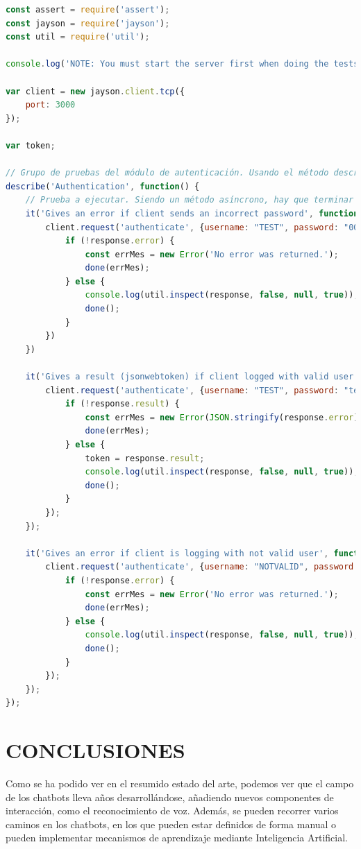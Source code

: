\documentclass[spanish,12pt, a4paper, twoside]{paper}
\let\oldsection\section
\def\section{\cleardoublepage\oldsection}
\begin{document}
\begin{lstlisting}[language=JavaScript]
const assert = require('assert');
const jayson = require('jayson');
const util = require('util');

console.log('NOTE: You must start the server first when doing the tests.');

var client = new jayson.client.tcp({
	port: 3000
});

var token;

// Grupo de pruebas del módulo de autenticación. Usando el método describe, podemos definir dicho grupo.
describe('Authentication', function() {
	// Prueba a ejecutar. Siendo un método asíncrono, hay que terminar la función llamando al callback done() para éxito o done(Error) para caso de error.
	it('Gives an error if client sends an incorrect password', function(done) {
		client.request('authenticate', {username: "TEST", password: "0000"}, function(err, response) {
			if (!response.error) {
				const errMes = new Error('No error was returned.');
				done(errMes);
			} else {
				console.log(util.inspect(response, false, null, true));
				done();
			}
		})
	})

	it('Gives a result (jsonwebtoken) if client logged with valid user', function(done) {
		client.request('authenticate', {username: "TEST", password: "test"}, function(err, response) {
			if (!response.result) {
				const errMes = new Error(JSON.stringify(response.error));
				done(errMes);
			} else {
				token = response.result;
				console.log(util.inspect(response, false, null, true));
				done();
			}
		});
	});

	it('Gives an error if client is logging with not valid user', function(done) {
		client.request('authenticate', {username: "NOTVALID", password: "notvalid"}, function(err, response) {
			if (!response.error) {
				const errMes = new Error('No error was returned.');
				done(errMes);
			} else {
				console.log(util.inspect(response, false, null, true));
				done();
			}
		});
	});
});
\end{lstlisting}
 
\section{CONCLUSIONES}

Como se ha podido ver en el resumido estado del arte, podemos ver que el campo de los chatbots lleva años desarrollándose, añadiendo nuevos componentes de interacción, como el reconocimiento de voz. Además, se pueden recorrer varios caminos en los chatbots, en los que pueden estar definidos de forma manual o pueden implementar mecanismos de aprendizaje mediante Inteligencia Artificial.
\newline
\end{document}
